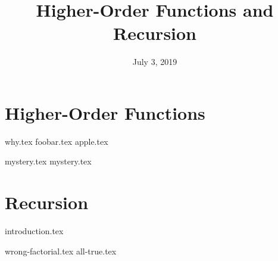 \documentclass{exam}
\title{Higher-Order Functions and Recursion}
\date{July 3, 2019}
\begin{document}
\maketitle

\section{Higher-Order Functions}
\begin{questions}
{why.tex}
{foobar.tex}
{apple.tex}
\clearpage

{mystery.tex}
{mystery.tex}
\clearpage

\section{Recursion}
{introduction.tex}
\begin{questions}
{wrong-factorial.tex}
{all-true.tex}
\clearpage

\end{questions}
\end{questions}
\end{document}
